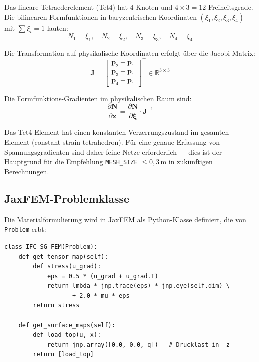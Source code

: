 \documentclass[a4paper,11pt]{article}
\begin{document}
Das lineare Tetraederelement (Tet4) hat 4 Knoten und $4 \times 3 = 12$ Freiheitsgrade. Die bilinearen Formfunktionen in baryzentrischen Koordinaten $(\xi_1, \xi_2, \xi_3, \xi_4)$ mit $\sum \xi_i = 1$ lauten:
\[
  N_1 = \xi_1, \quad N_2 = \xi_2, \quad N_3 = \xi_3, \quad N_4 = \xi_4
\]

Die Transformation auf physikalische Koordinaten erfolgt über die Jacobi-Matrix:
\begin{equation}
  \mathbf{J} = \begin{bmatrix}
    \mathbf{p}_2 - \mathbf{p}_1 \\
    \mathbf{p}_3 - \mathbf{p}_1 \\
    \mathbf{p}_4 - \mathbf{p}_1
  \end{bmatrix}^\top \in \mathbb{R}^{3\times 3}
\end{equation}

Die Formfunktions-Gradienten im physikalischen Raum sind:
\begin{equation}
  \frac{\partial \mathbf{N}}{\partial \mathbf{x}} = \frac{\partial \mathbf{N}}{\partial \boldsymbol{\xi}} \cdot \mathbf{J}^{-1}
\end{equation}

Das Tet4-Element hat einen konstanten Verzerrungszustand im gesamten Element (constant strain tetrahedron). Für eine genaue Erfassung von Spannungsgradienten sind daher feine Netze erforderlich — dies ist der Hauptgrund für die Empfehlung \texttt{MESH\_SIZE} $\leq 0{,}3$\,m in zukünftigen Berechnungen.

\subsection{JaxFEM-Problemklasse}

Die Materialformulierung wird in JaxFEM als Python-Klasse definiert, die von \texttt{Problem} erbt:

\begin{lstlisting}[caption={JaxFEM-Problemklasse IFC\_SG\_FEM}]
class IFC_SG_FEM(Problem):
    def get_tensor_map(self):
        def stress(u_grad):
            eps = 0.5 * (u_grad + u_grad.T)
            return lmbda * jnp.trace(eps) * jnp.eye(self.dim) \
                   + 2.0 * mu * eps
        return stress

    def get_surface_maps(self):
        def load_top(u, x):
            return jnp.array([0.0, 0.0, q])   # Drucklast in -z
        return [load_top]
\end{lstlisting}
\end{document}
